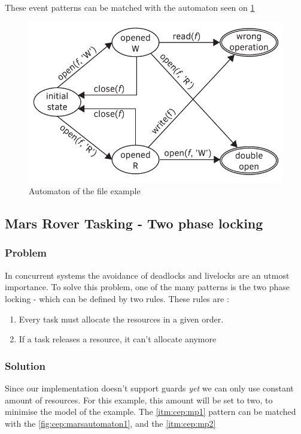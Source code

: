 				These event patterns can be matched with the automaton seen on \cref{fig:cep:fileautomaton}
				
				\begin{figure}[h]
				\centering
				\includegraphics[width=0.7\linewidth]{include/figures/chapter_5/file_example_aut}
				\caption{Automaton of the file example}
				\label{fig:cep:fileautomaton}
				\end{figure}

		
		
		\subsection{Mars Rover Tasking - Two phase locking}
			\subsubsection{Problem}
				In concurrent systems the avoidance of deadlocks and livelocks are an utmost importance.
				To solve this problem, one of the many patterns is  the two phase locking - which can be defined by two rules.
				These rules are : 
				\begin{enumerate}
					\item \label{itm:cep:mp1} Every task must allocate the resources in a given order.
					\item \label{itm:cep:mp2} If a task releases a resource, it can't allocate anymore
				\end{enumerate}
			\subsubsection{Solution}
				Since our implementation doesn't support guards \emph{yet} we can only use constant amount of resources.
				For this example, this amount will be set to two, to minimise the model of the example.
				The \cref{itm:cep:mp1} pattern can be matched with the \cref {fig:cep:marsautomaton1}, and the \cref{itm:cep:mp2} 

